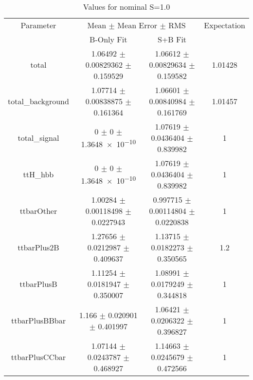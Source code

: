 \begin{table}
\centering
\caption{Values for nominal S=1.0}
\begin{tabular}{cccc}
\toprule
Parameter & \multicolumn{2}{c}{Mean $\pm$ Mean Error $\pm$ RMS} & Expectation\\
 & B-Only Fit & S+B Fit & \\
\midrule
total & \num{1.06492} $\pm$ \num{0.00829362} $\pm$ \num{0.159529} & \num{1.06612} $\pm$ \num{0.00829634} $\pm$ \num{0.159582} & \num{1.01428}\\
total\_background & \num{1.07714} $\pm$ \num{0.00838875} $\pm$ \num{0.161364} & \num{1.06601} $\pm$ \num{0.00840984} $\pm$ \num{0.161769} & \num{1.01457}\\
total\_signal & \num{0} $\pm$ \num{0} $\pm$ \num{1.3648e-10} & \num{1.07619} $\pm$ \num{0.0436404} $\pm$ \num{0.839982} & \num{1}\\
ttH\_hbb & \num{0} $\pm$ \num{0} $\pm$ \num{1.3648e-10} & \num{1.07619} $\pm$ \num{0.0436404} $\pm$ \num{0.839982} & \num{1}\\
ttbarOther & \num{1.00284} $\pm$ \num{0.00118498} $\pm$ \num{0.0227943} & \num{0.997715} $\pm$ \num{0.00114804} $\pm$ \num{0.0220838} & \num{1}\\
ttbarPlus2B & \num{1.27656} $\pm$ \num{0.0212987} $\pm$ \num{0.409637} & \num{1.13715} $\pm$ \num{0.0182273} $\pm$ \num{0.350565} & \num{1.2}\\
ttbarPlusB & \num{1.11254} $\pm$ \num{0.0181947} $\pm$ \num{0.350007} & \num{1.08991} $\pm$ \num{0.0179249} $\pm$ \num{0.344818} & \num{1}\\
ttbarPlusBBbar & \num{1.166} $\pm$ \num{0.020901} $\pm$ \num{0.401997} & \num{1.06421} $\pm$ \num{0.0206322} $\pm$ \num{0.396827} & \num{1}\\
ttbarPlusCCbar & \num{1.07144} $\pm$ \num{0.0243787} $\pm$ \num{0.468927} & \num{1.14663} $\pm$ \num{0.0245679} $\pm$ \num{0.472566} & \num{1}\\
\bottomrule
\end{tabular}
\end{table}